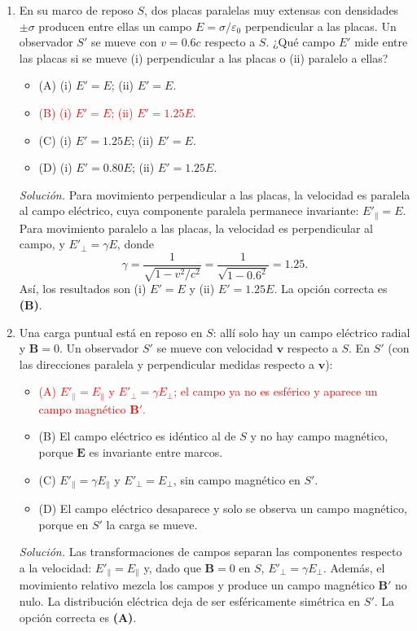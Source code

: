 \documentclass[11pt]{article}
\begin{document}
\begin{enumerate}
    \item En su marco de reposo $S$, dos placas paralelas muy extensas con densidades $\pm\sigma$ producen entre ellas un campo $E=\sigma/\varepsilon_0$ perpendicular a las placas. Un observador $S'$ se mueve con $v=0.6c$ respecto a $S$. ¿Qué campo $E'$ mide entre las placas si se mueve (i) perpendicular a las placas o (ii) paralelo a ellas?
    \begin{itemize}
        \item (A) (i) $E'=E$; (ii) $E'=E$.
        \item \textcolor{red}{(B) (i) $E'=E$; (ii) $E'=1.25E$.}
        \item (C) (i) $E'=1.25E$; (ii) $E'=E$.
        \item (D) (i) $E'=0.80E$; (ii) $E'=1.25E$.
    \end{itemize}
    \textit{Solución.} Para movimiento perpendicular a las placas, la velocidad es paralela al campo eléctrico, cuya componente paralela permanece invariante: $E'_{\parallel}=E$. Para movimiento paralelo a las placas, la velocidad es perpendicular al campo, y $E'_{\perp}=\gamma E$, donde
    \[
        \gamma=\frac{1}{\sqrt{1-v^2/c^2}}=\frac{1}{\sqrt{1-0.6^2}}=1.25.
    \]
    Así, los resultados son (i) $E'=E$ y (ii) $E'=1.25E$. La opción correcta es \textbf{(B)}. \parencite{chaparro2026}

    \item Una carga puntual está en reposo en $S$: allí solo hay un campo eléctrico radial y $\mathbf{B}=0$. Un observador $S'$ se mueve con velocidad $\mathbf{v}$ respecto a $S$. En $S'$ (con las direcciones paralela y perpendicular medidas respecto a $\mathbf{v}$):
    \begin{itemize}
        \item \textcolor{red}{(A) $E'_{\parallel}=E_{\parallel}$ y $E'_{\perp}=\gamma E_{\perp}$; el campo ya no es esférico y aparece un campo magnético $\mathbf{B}'$.}
        \item (B) El campo eléctrico es idéntico al de $S$ y no hay campo magnético, porque $\mathbf{E}$ es invariante entre marcos.
        \item (C) $E'_{\parallel}=\gamma E_{\parallel}$ y $E'_{\perp}=E_{\perp}$, sin campo magnético en $S'$.
        \item (D) El campo eléctrico desaparece y solo se observa un campo magnético, porque en $S'$ la carga se mueve.
    \end{itemize}
    \textit{Solución.} Las transformaciones de campos separan las componentes respecto a la velocidad: $E'_{\parallel}=E_{\parallel}$ y, dado que $\mathbf{B}=0$ en $S$, $E'_{\perp}=\gamma E_{\perp}$. Además, el movimiento relativo mezcla los campos y produce un campo magnético $\mathbf{B}'$ no nulo. La distribución eléctrica deja de ser esféricamente simétrica en $S'$. La opción correcta es \textbf{(A)}. \parencite{chaparro2026}


\end{enumerate}
\end{document}
